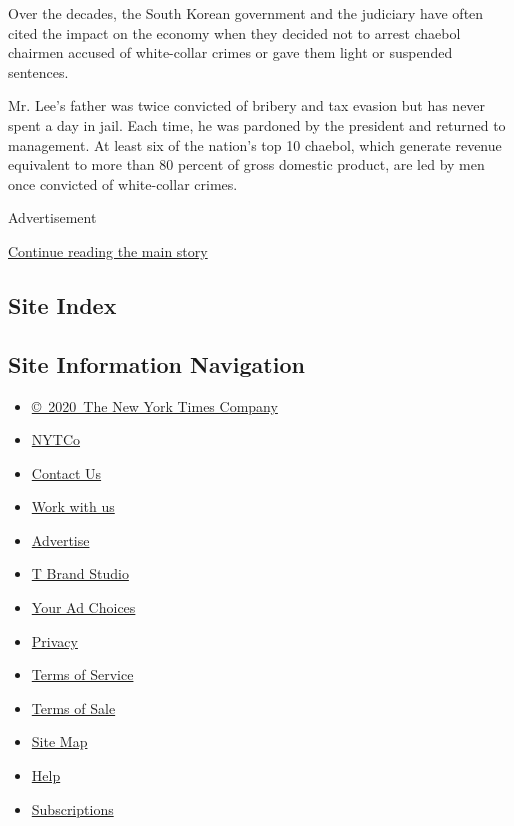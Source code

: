 Over the decades, the South Korean government and the judiciary have
often cited the impact on the economy when they decided not to arrest
chaebol chairmen accused of white-collar crimes or gave them light or
suspended sentences.

Mr. Lee's father was twice convicted of bribery and tax evasion but has
never spent a day in jail. Each time, he was pardoned by the president
and returned to management. At least six of the nation's top 10 chaebol,
which generate revenue equivalent to more than 80 percent of gross
domestic product, are led by men once convicted of white-collar crimes.

Advertisement

\protect\hyperlink{after-bottom}{Continue reading the main story}

\hypertarget{site-index}{%
\subsection{Site Index}\label{site-index}}

\hypertarget{site-information-navigation}{%
\subsection{Site Information
Navigation}\label{site-information-navigation}}

\begin{itemize}
\tightlist
\item
  \href{https://help.nytimes.com/hc/en-us/articles/115014792127-Copyright-notice}{©~2020~The
  New York Times Company}
\end{itemize}

\begin{itemize}
\tightlist
\item
  \href{https://www.nytco.com/}{NYTCo}
\item
  \href{https://help.nytimes.com/hc/en-us/articles/115015385887-Contact-Us}{Contact
  Us}
\item
  \href{https://www.nytco.com/careers/}{Work with us}
\item
  \href{https://nytmediakit.com/}{Advertise}
\item
  \href{http://www.tbrandstudio.com/}{T Brand Studio}
\item
  \href{https://www.nytimes.com/privacy/cookie-policy\#how-do-i-manage-trackers}{Your
  Ad Choices}
\item
  \href{https://www.nytimes.com/privacy}{Privacy}
\item
  \href{https://help.nytimes.com/hc/en-us/articles/115014893428-Terms-of-service}{Terms
  of Service}
\item
  \href{https://help.nytimes.com/hc/en-us/articles/115014893968-Terms-of-sale}{Terms
  of Sale}
\item
  \href{https://spiderbites.nytimes.com}{Site Map}
\item
  \href{https://help.nytimes.com/hc/en-us}{Help}
\item
  \href{https://www.nytimes.com/subscription?campaignId=37WXW}{Subscriptions}
\end{itemize}
